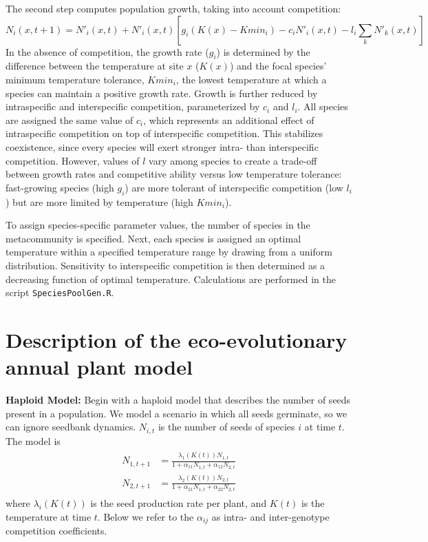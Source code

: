 \documentclass[11pt]{article}
\begin{document}
The second step computes population growth, taking into account competition:
\begin{equation}
N_{i}(x,t+1) = N'_{i}(x,t) + N'_{i}(x,t)[g_i(K(x) - Kmin_i) - c_i N'_{i}(x,t) - l_i \sum_{k} N'_{k}(x,t)]
\end{equation}
In the absence of competition, the growth rate ($g_i$) is determined by the difference between the temperature at site $x$ ($K(x)$) and the focal species' minimum temperature tolerance, $Kmin_i$, the lowest temperature at which a species can maintain a positive growth rate. Growth is further reduced by intraspecific and interspecific competition, parameterized by $c_i$ and $l_i$.  All species are assigned the same value of $c_i$, which represents an additional effect of intraspecific competition on top of interspecific competition. This stabilizes coexistence, since every species will exert stronger intra- than interspecific competition. However, values of $l$ vary among species to create a trade-off between growth rates and competitive ability versus low temperature tolerance: fast-growing species (high $g_i$) are more tolerant of interspecific competition (low $l_i$) but are more limited by temperature (high $Kmin_i$).

To assign species-specific parameter values, the number of species in the metacommunity is specified. Next, each species is assigned an optimal temperature within a specified temperature range by drawing from a uniform distribution. Sensitivity to interspecific competition is then determined as a decreasing function of optimal temperature. Calculations are performed in the script \texttt{SpeciesPoolGen.R}.   

\section{Description of the eco-evolutionary annual plant model}\label{eco-evo}


\noindent \textbf{Haploid Model:} Begin with a haploid model that describes the number of seeds present in a population. We model a scenario in which all seeds germinate, so we can ignore seedbank dynamics.  $N_{i,t}$ is the number of seeds of species $i$ at time $t$. The model is
\begin{align}\begin{split}
N_{1,t+1} &= \frac{\lambda_1(K(t))N_{1,t}}{1+ \alpha_{11}N_{1,t} + \alpha_{12}N_{2,t}}\\
N_{2,t+1} &= \frac{\lambda_2(K(t))N_{2,t}}{1+ \alpha_{21}N_{1,t} + \alpha_{22}N_{2,t}}
\end{split}\end{align}
where $\lambda_{i}(K(t))$ is the seed production rate per plant, and $K(t)$ is the temperature at time $t$.  Below we refer to the $\alpha_{ij}$ as intra- and inter-genotype competition coefficients. 
\end{document}
